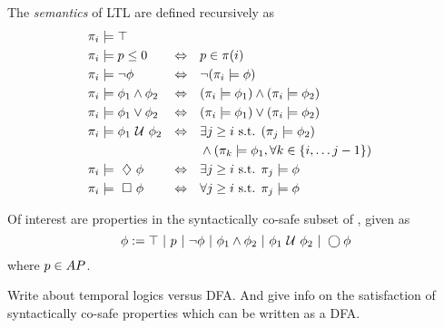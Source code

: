 \documentclass{ifacconf}
\newcommand{\red}[1]{{\color{red} #1}}
\begin{document}
    \begin{definition}
    \label{def:gdtl-semantics}
%    
     The {\em semantics} of LTL  are defined recursively as
    \begin{align*}
    &\word_i \models  \top  & \\
    &\word_i \models p \leq 0 & \Equiv\quad &p\in\word(i)\\ %
    &\word_i \models \notltl \phi & \Equiv\quad & \notltl (\word_i \models \phi) \\
    &\word_i \models \phi_1 \andltl  \phi_2  & \Equiv\quad & ( \word_i \models \phi_1 ) \andltl ( \word_i \models \phi_2 ) \\
    &\word_i \models \phi_1 \orltl  \phi_2  & \Equiv\quad & ( \word_i \models \phi_1 ) \orltl ( \word_i \models \phi_2 ) \\
    &\word_i \models  \phi_1 \Until \phi_2 & \Equiv\quad & \exists j \geq i \text{ s.t. } (\word_j \models \phi_2 ) \\
    & & & \andltl (\word_k \models \phi_1, \forall k \in \{i, \ldots j-1\})\\
    &\word_i \models \Event \phi  & \Equiv\quad & \exists j \geq i \text{ s.t. }\word_j \models \phi \\
    &\word_i \models \Always \phi  & \Equiv\quad & \forall j \geq i \text{ s.t. }\word_j \models \phi
    \end{align*}
    
    \end{definition}



Of interest are properties in the syntactically co-safe subset of \DTL, given as
    \begin{equation}\label{eq:scLTL}
     \phi :=  \top \ |\ p \ |\ \neg \phi \ |\ \phi_1 \wedge \phi_2 \ |\ \phi_1 \ \mathcal{U}\  \phi_2 \ |\ \bigcirc \phi
    \end{equation}     where $p\in AP$.
     
\red{Write about temporal logics versus DFA. And give info on the satisfaction of syntactically co-safe properties which can be written as a DFA.}
\end{document}
